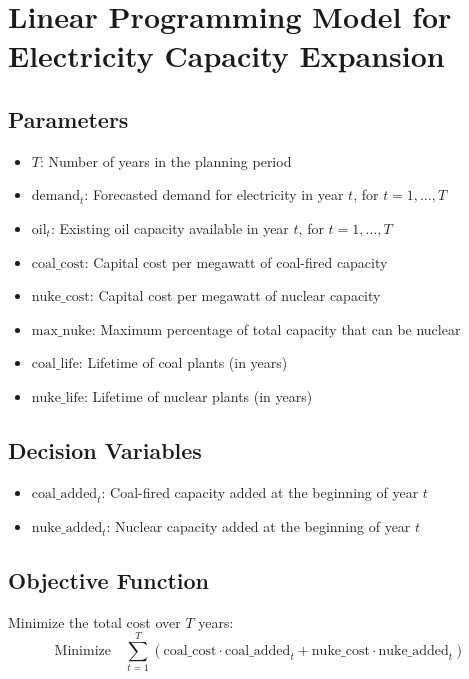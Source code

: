\documentclass{article}
\begin{document}
\section*{Linear Programming Model for Electricity Capacity Expansion}

\subsection*{Parameters}
\begin{itemize}
    \item \( T \): Number of years in the planning period
    \item \( \text{demand}_t \): Forecasted demand for electricity in year \( t \), for \( t = 1, \ldots, T \)
    \item \( \text{oil}_t \): Existing oil capacity available in year \( t \), for \( t = 1, \ldots, T \)
    \item \( \text{coal\_cost} \): Capital cost per megawatt of coal-fired capacity
    \item \( \text{nuke\_cost} \): Capital cost per megawatt of nuclear capacity
    \item \( \text{max\_nuke} \): Maximum percentage of total capacity that can be nuclear
    \item \( \text{coal\_life} \): Lifetime of coal plants (in years)
    \item \( \text{nuke\_life} \): Lifetime of nuclear plants (in years)
\end{itemize}

\subsection*{Decision Variables}
\begin{itemize}
    \item \( \text{coal\_added}_t \): Coal-fired capacity added at the beginning of year \( t \)
    \item \( \text{nuke\_added}_t \): Nuclear capacity added at the beginning of year \( t \)
\end{itemize}

\subsection*{Objective Function}
Minimize the total cost over \( T \) years:
\[
\text{Minimize} \quad \sum_{t=1}^{T} (\text{coal\_cost} \cdot \text{coal\_added}_t + \text{nuke\_cost} \cdot \text{nuke\_added}_t)
\]
\end{document}
